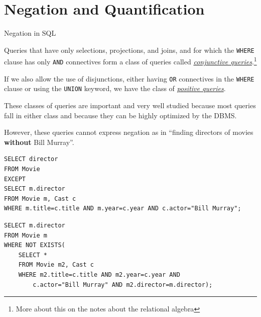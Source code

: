 \documentclass[xcolor={usenames,dvipsnames}]{beamer}
\begin{document}
%
%
%
%

\section{Negation and Quantification}

%
%

\begin{frame}{Negation in SQL}

Queries that have only selections, projections, and joins, and for which the \lstinline[style=SQL]{WHERE} clause has only \lstinline[style=SQL]{AND} connectives form a class of queries called \underline{\emph{conjunctive queries}}.\footnote{More about this on the notes about the relational algebra}

If we also allow the use of disjunctions, either having \lstinline[style=SQL]{OR} connectives in the \lstinline[style=SQL]{WHERE} clause or using the \lstinline[style=SQL]{UNION} keyword, we have the class of \underline{\emph{positive queries}}.

These classes of queries are important and very well studied because most queries fall in either class and because they can be highly optimized by the DBMS.

However, these queries cannot express negation as in ``finding directors of movies \textbf{without} Bill Murray''.
\end{frame}

%
%


\newsavebox{\NEGATIONi}
\begin{lrbox}{\NEGATIONi}
\begin{lstlisting}[style=SQL]
SELECT director 
FROM Movie
EXCEPT
SELECT m.director
FROM Movie m, Cast c
WHERE m.title=c.title AND m.year=c.year AND c.actor="Bill Murray";
\end{lstlisting}
\end{lrbox}

\newsavebox{\NEGATIONii}
\begin{lrbox}{\NEGATIONii}
\begin{lstlisting}[style=SQL]
SELECT m.director 
FROM Movie m
WHERE NOT EXISTS(
    SELECT *
    FROM Movie m2, Cast c
    WHERE m2.title=c.title AND m2.year=c.year AND 
        c.actor="Bill Murray" AND m2.director=m.director);
\end{lstlisting}
\end{lrbox}
\end{document}
